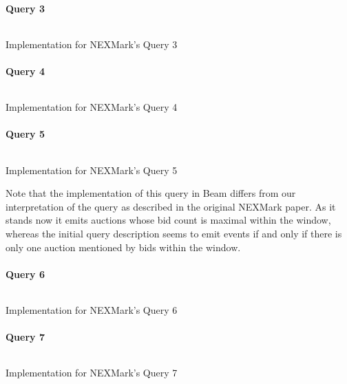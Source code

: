 \paragraph{Query 3}
\begin{listing}[H]
  \inputminted[firstline=493,lastline=502]{rust}{benchmarks/src/nexmark.rs}
  \caption{Implementation for NEXMark's Query 3}
  \label{lst:nexmark-query3}
\end{listing}

\paragraph{Query 4}
\begin{listing}[H]
  \inputminted[firstline=533,lastline=534]{rust}{benchmarks/src/nexmark.rs}
  \caption{Implementation for NEXMark's Query 4}
  \label{lst:nexmark-query4}
\end{listing}

\paragraph{Query 5}
\begin{listing}[H]
  \inputminted[firstline=562,lastline=571]{rust}{benchmarks/src/nexmark.rs}
  \caption{Implementation for NEXMark's Query 5}
  \label{lst:nexmark-query5}
\end{listing}

Note that the implementation of this query in Beam differs from our interpretation of the query as described in the original NEXMark paper. As it stands now it emits auctions whose bid count is maximal within the window, whereas the initial query description seems to emit events if and only if there is only one auction mentioned by bids within the window.

\paragraph{Query 6}
\begin{listing}[H]
  \inputminted[firstline=596,lastline=598]{rust}{benchmarks/src/nexmark.rs}
  \caption{Implementation for NEXMark's Query 6}
  \label{lst:nexmark-query6}
\end{listing}

\paragraph{Query 7}
\begin{listing}[H]
  \inputminted[firstline=631,lastline=637]{rust}{benchmarks/src/nexmark.rs}
  \caption{Implementation for NEXMark's Query 7}
  \label{lst:nexmark-query7}
\end{listing}


